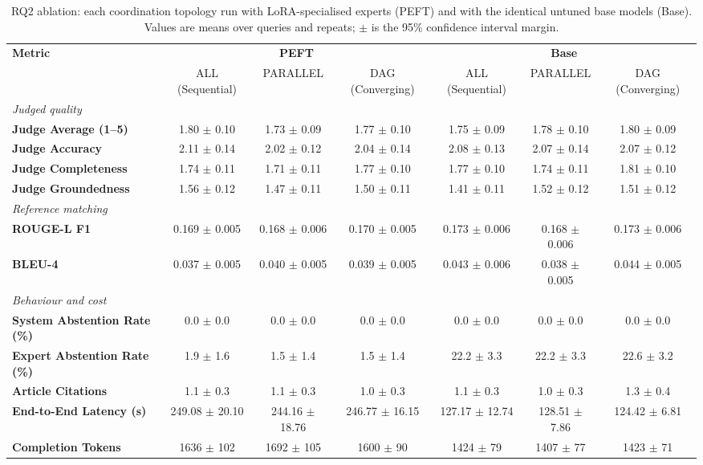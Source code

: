 \begin{table}[t]
\centering
\caption{RQ2 ablation: each coordination topology run with LoRA-specialised experts (PEFT) and with the identical untuned base models (Base). Values are means over queries and repeats; $\pm$ is the 95\% confidence interval margin.}
\label{tab:peft_ablation}
\footnotesize
\begin{tabular}{lcccccc}
\toprule
\textbf{Metric} & \multicolumn{3}{c}{\textbf{PEFT}} & \multicolumn{3}{c}{\textbf{Base}} \\
\cmidrule(lr){2-4}\cmidrule(lr){5-7}
 & ALL (Sequential) & PARALLEL & DAG (Converging) & ALL (Sequential) & PARALLEL & DAG (Converging) \\
\midrule
\multicolumn{7}{l}{\textit{Judged quality}} \\
\textbf{Judge Average (1--5)} & 1.80 $\pm$ 0.10 & 1.73 $\pm$ 0.09 & 1.77 $\pm$ 0.10 & 1.75 $\pm$ 0.09 & 1.78 $\pm$ 0.10 & 1.80 $\pm$ 0.09 \\
\textbf{Judge Accuracy} & 2.11 $\pm$ 0.14 & 2.02 $\pm$ 0.12 & 2.04 $\pm$ 0.14 & 2.08 $\pm$ 0.13 & 2.07 $\pm$ 0.14 & 2.07 $\pm$ 0.12 \\
\textbf{Judge Completeness} & 1.74 $\pm$ 0.11 & 1.71 $\pm$ 0.11 & 1.77 $\pm$ 0.10 & 1.77 $\pm$ 0.10 & 1.74 $\pm$ 0.11 & 1.81 $\pm$ 0.10 \\
\textbf{Judge Groundedness} & 1.56 $\pm$ 0.12 & 1.47 $\pm$ 0.11 & 1.50 $\pm$ 0.11 & 1.41 $\pm$ 0.11 & 1.52 $\pm$ 0.12 & 1.51 $\pm$ 0.12 \\
\midrule
\multicolumn{7}{l}{\textit{Reference matching}} \\
\textbf{ROUGE-L F1} & 0.169 $\pm$ 0.005 & 0.168 $\pm$ 0.006 & 0.170 $\pm$ 0.005 & 0.173 $\pm$ 0.006 & 0.168 $\pm$ 0.006 & 0.173 $\pm$ 0.006 \\
\textbf{BLEU-4} & 0.037 $\pm$ 0.005 & 0.040 $\pm$ 0.005 & 0.039 $\pm$ 0.005 & 0.043 $\pm$ 0.006 & 0.038 $\pm$ 0.005 & 0.044 $\pm$ 0.005 \\
\midrule
\multicolumn{7}{l}{\textit{Behaviour and cost}} \\
\textbf{System Abstention Rate (\%)} & 0.0 $\pm$ 0.0 & 0.0 $\pm$ 0.0 & 0.0 $\pm$ 0.0 & 0.0 $\pm$ 0.0 & 0.0 $\pm$ 0.0 & 0.0 $\pm$ 0.0 \\
\textbf{Expert Abstention Rate (\%)} & 1.9 $\pm$ 1.6 & 1.5 $\pm$ 1.4 & 1.5 $\pm$ 1.4 & 22.2 $\pm$ 3.3 & 22.2 $\pm$ 3.3 & 22.6 $\pm$ 3.2 \\
\textbf{Article Citations} & 1.1 $\pm$ 0.3 & 1.1 $\pm$ 0.3 & 1.0 $\pm$ 0.3 & 1.1 $\pm$ 0.3 & 1.0 $\pm$ 0.3 & 1.3 $\pm$ 0.4 \\
\textbf{End-to-End Latency (s)} & 249.08 $\pm$ 20.10 & 244.16 $\pm$ 18.76 & 246.77 $\pm$ 16.15 & 127.17 $\pm$ 12.74 & 128.51 $\pm$ 7.86 & 124.42 $\pm$ 6.81 \\
\textbf{Completion Tokens} & 1636 $\pm$ 102 & 1692 $\pm$ 105 & 1600 $\pm$ 90 & 1424 $\pm$ 79 & 1407 $\pm$ 77 & 1423 $\pm$ 71 \\
\bottomrule
\end{tabular}
\end{table}